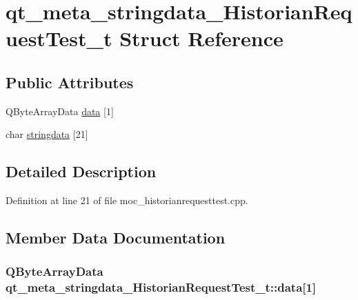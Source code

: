 \hypertarget{structqt__meta__stringdata___historian_request_test__t}{}\section{qt\+\_\+meta\+\_\+stringdata\+\_\+\+Historian\+Request\+Test\+\_\+t Struct Reference}
\label{structqt__meta__stringdata___historian_request_test__t}
\subsection*{Public Attributes}
\begin{DoxyCompactItemize}
\item 
Q\+Byte\+Array\+Data \hyperlink{structqt__meta__stringdata___historian_request_test__t_aeb20528c99cae379e1e50492b498d9d0}{data} \mbox{[}1\mbox{]}
\item 
char \hyperlink{structqt__meta__stringdata___historian_request_test__t_a8dfc92f1ad24d7e8bf83248b914af8bc}{stringdata} \mbox{[}21\mbox{]}
\end{DoxyCompactItemize}


\subsection{Detailed Description}


Definition at line 21 of file moc\+\_\+historianrequesttest.\+cpp.



\subsection{Member Data Documentation}
\hypertarget{structqt__meta__stringdata___historian_request_test__t_aeb20528c99cae379e1e50492b498d9d0}{}
\subsubsection[{data}]{\setlength{\rightskip}{0pt plus 5cm}Q\+Byte\+Array\+Data qt\+\_\+meta\+\_\+stringdata\+\_\+\+Historian\+Request\+Test\+\_\+t\+::data\mbox{[}1\mbox{]}}\label{structqt__meta__stringdata___historian_request_test__t_aeb20528c99cae379e1e50492b498d9d0}


